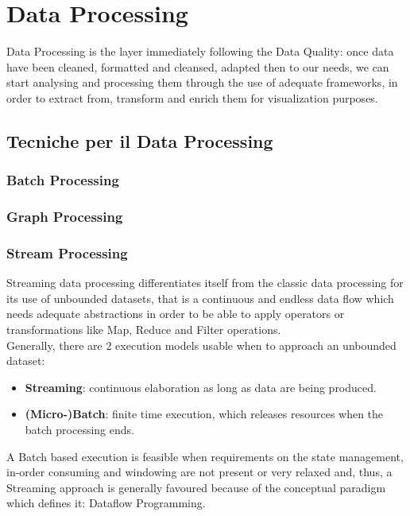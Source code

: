 \chapter{Data Processing}

Data Processing is the layer immediately following the Data Quality: once data have been cleaned, formatted and cleansed, adapted then to our needs, we can start analysing and processing them through the use of adequate frameworks, in order to extract from, transform and enrich them for visualization purposes.\\

\section{Tecniche per il Data Processing}

\subsection{Batch Processing} \label{BatchProc}

\subsection{Graph Processing} \label{GraphProc}

\subsection{Stream Processing} \label{StreamProc}

Streaming data processing differentiates itself from the classic data processing for its use of unbounded datasets, that is a continuous and endless data flow which needs adequate abstractions in order to be able to apply operators or transformations like Map, Reduce and Filter operations. \\ 

Generally, there are 2 execution models usable when to approach an unbounded dataset:

\begin{itemize}
    \item \textbf{Streaming}: continuous elaboration as long as data are being produced.
    \item \textbf{(Micro-)Batch}: finite time execution, which releases resources when the batch processing ends.
\end{itemize}

A Batch based execution is feasible when requirements on the state management, in-order consuming and windowing are not present or very relaxed and, thus, a Streaming approach is generally favoured because of the conceptual paradigm which defines it: Dataflow Programming.

